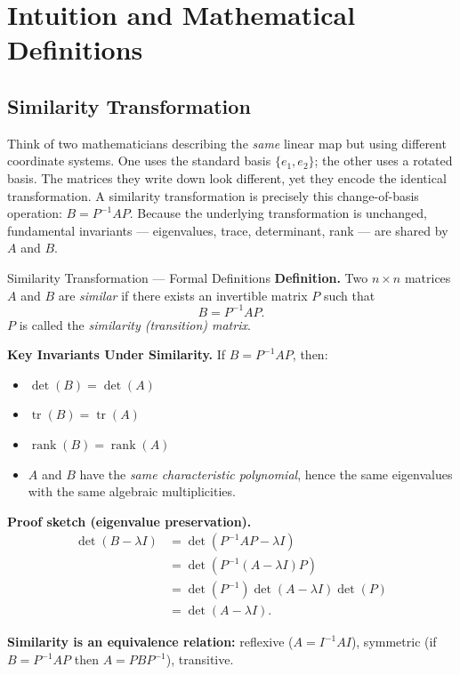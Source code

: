 \documentclass[12pt,a4paper]{article}
\begin{document}
\section{Intuition and Mathematical Definitions}

\subsection{Similarity Transformation}

Think of two mathematicians describing the \emph{same} linear map but using different coordinate systems.
One uses the standard basis $\{e_1, e_2\}$; the other uses a rotated basis.
The matrices they write down look different, yet they encode the identical transformation.
A similarity transformation is precisely this change-of-basis operation: $B = P^{-1}AP$.
Because the underlying transformation is unchanged, fundamental invariants --- eigenvalues, trace, determinant, rank --- are shared by $A$ and $B$.

\begin{infobox}{Similarity Transformation --- Formal Definitions}
\textbf{Definition.}
Two $n\times n$ matrices $A$ and $B$ are \emph{similar} if there exists an invertible matrix $P$ such that
\[
  B = P^{-1}AP.
\]
$P$ is called the \emph{similarity (transition) matrix}.

\textbf{Key Invariants Under Similarity.}
If $B = P^{-1}AP$, then:
\begin{itemize}[leftmargin=*]
  \item $\det(B) = \det(A)$
  \item $\operatorname{tr}(B) = \operatorname{tr}(A)$
  \item $\operatorname{rank}(B) = \operatorname{rank}(A)$
  \item $A$ and $B$ have the \emph{same characteristic polynomial}, hence the same eigenvalues with the same algebraic multiplicities.
\end{itemize}

\textbf{Proof sketch (eigenvalue preservation).}
\begin{align*}
  \det(B - \lambda I) &= \det(P^{-1}AP - \lambda I)\\
                      &= \det(P^{-1}(A-\lambda I)P)\\
                      &= \det(P^{-1})\det(A-\lambda I)\det(P)\\
                      &= \det(A-\lambda I).
\end{align*}

\textbf{Similarity is an equivalence relation:}
reflexive ($A = I^{-1}AI$), symmetric (if $B=P^{-1}AP$ then $A=PBP^{-1}$), transitive.
\end{infobox}
\end{document}
